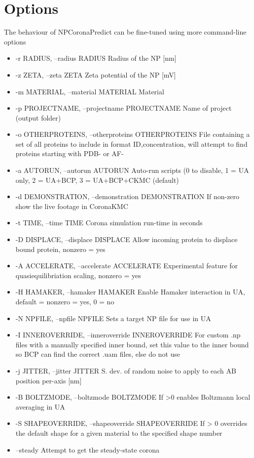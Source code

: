 \documentclass[10pt,a4paper,onecolumn]{report}
\begin{document}
\section{Options}
The behaviour of NPCoronaPredict can be fine-tuned using more command-line options
\begin{itemize}
\item  -r RADIUS, --radius RADIUS                        Radius of the NP [nm]
\item  -z ZETA, --zeta ZETA  Zeta potential of the NP [mV]
\item  -m MATERIAL, --material MATERIAL                        Material
\item  -p PROJECTNAME, --projectname PROJECTNAME Name of project (output folder)
\item  -o OTHERPROTEINS, --otherproteins OTHERPROTEINS                        File containing a set of all proteins to include in format ID,concentration, will attempt to find proteins starting with PDB- or AF-
\item  -a AUTORUN, --autorun AUTORUN                        Auto-run scripts (0 to disable, 1 = UA only, 2 = UA+BCP, 3 = UA+BCP+CKMC (default)
\item  -d DEMONSTRATION, --demonstration DEMONSTRATION                        If non-zero show the live footage in CoronaKMC
\item  -t TIME, --time TIME  Corona simulation run-time in seconds
\item  -D DISPLACE, --displace DISPLACE                        Allow incoming protein to displace bound protein, nonzero = yes
\item  -A ACCELERATE, --accelerate ACCELERATE                        Experimental feature for quasiequilibriation scaling, nonzero = yes
\item  -H HAMAKER, --hamaker HAMAKER                        Enable Hamaker interaction in UA, default = nonzero = yes, 0 = no
\item  -N NPFILE, --npfile NPFILE                        Sets a target NP file for use in UA
\item  -I INNEROVERRIDE, --inneroverride INNEROVERRIDE                        For custom .np files with a manually specified inner bound, set this value to the inner bound so BCP can find the correct .uam files, else do not use
\item  -j JITTER, --jitter JITTER                        S. dev. of random noise to apply to each AB position per-axis [nm]
\item  -B BOLTZMODE, --boltzmode BOLTZMODE                        If >0 enables Boltzmann local averaging in UA
\item  -S SHAPEOVERRIDE, --shapeoverride SHAPEOVERRIDE                        If > 0 overrides the default shape for a given material to the specified shape number
\item  --steady              Attempt to get the steady-state corona
\end{itemize}
\end{document}
